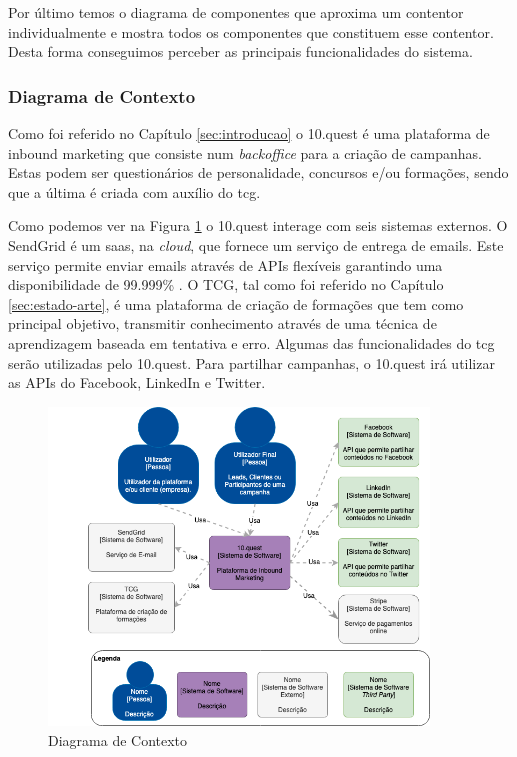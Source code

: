 Por último temos o diagrama de componentes que aproxima um contentor individualmente e mostra todos os componentes que constituem esse contentor. Desta forma conseguimos perceber as principais funcionalidades do sistema. 


\subsubsection{Diagrama de Contexto}

Como foi referido no Capítulo \ref{sec:introducao} o 10.quest é uma plataforma de inbound marketing que consiste num \textit{backoffice} para a criação de campanhas. Estas podem ser questionários de personalidade, concursos e/ou formações, sendo que a última é criada com auxílio do \acrshort{tcg}.

Como podemos ver na Figura \ref{fig:arq-contexto} o 10.quest interage com seis sistemas externos. O SendGrid\cite{sg} é um \acrshort{saas}, na \textit{cloud}, que fornece um serviço de entrega de emails. Este serviço permite enviar emails através de APIs flexíveis garantindo uma disponibilidade  de 99.999\% \cite{sguptime}. 
O TCG, tal como foi referido no Capítulo \ref{sec:estado-arte}, é uma plataforma de criação de formações que tem como principal objetivo, transmitir conhecimento através de uma técnica de aprendizagem baseada em tentativa e erro. Algumas das funcionalidades do \acrshort{tcg} serão utilizadas pelo 10.quest.
Para partilhar campanhas, o 10.quest irá utilizar as APIs do Facebook, LinkedIn e Twitter.


\newpage

\begin{figure}[ht!]
	\begin{center}
		\includegraphics[width=0.9\textwidth]{img/arq/diagrama-contexto}
		\caption{Diagrama de Contexto}
		\label{fig:arq-contexto}
	\end{center}
\end{figure}

